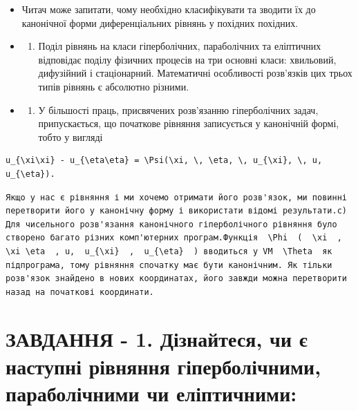 \documentclass[
  ukrainian,
]{article}
\providecommand{\tightlist}{%
  \setlength{\itemsep}{0pt}\setlength{\parskip}{0pt}}
\begin{document}
\begin{itemize}
\item
  Читач може запитати, чому необхідно класифікувати та зводити їх до
  канонічної форми диференціальних рівнянь у похідних похідних.
\item
  \begin{enumerate}
  \def\labelenumi{\alph{enumi})}
  \tightlist
  \item
    Поділ рівнянь на класи гіперболічних, параболічних та еліптичних
    відповідає поділу фізичних процесів на три основні класи: хвильовий,
    дифузійний і стаціонарний. Математичні особливості розв'язків цих
    трьох типів рівнянь є абсолютно різними.
  \end{enumerate}
\item
  \begin{enumerate}
  \def\labelenumi{\alph{enumi})}
  \setcounter{enumi}{1}
  \tightlist
  \item
    У більшості праць, присвячених розв'язанню гіперболічних задач,
    припускається, що початкове рівняння записується у канонічній формі,
    тобто у вигляді
  \end{enumerate}
\end{itemize}

\begin{verbatim}
u_{\xi\xi} - u_{\eta\eta} = \Psi(\xi, \, \eta, \, u_{\xi}, \, u, u_{\eta}).
\end{verbatim}

\begin{verbatim}
Якщо у нас є рівняння і ми хочемо отримати його розв'язок, ми повинні перетворити його у канонічну форму і використати відомі результати.c) Для чисельного розв'язання канонічного гіперболічного рівняння було створено багато різних комп'ютерних програм.Функція  \Phi  (  \xi  ,  \xi \eta  , u,  u_{\xi}  ,  u_{\eta}  ) вводиться у VM  \Theta  як підпрограма, тому рівняння спочатку має бути канонічним. Як тільки розв'язок знайдено в нових координатах, його завжди можна перетворити назад на початкові координати.
\end{verbatim}

\section{ЗАВДАННЯ - 1. Дізнайтеся, чи є наступні рівняння
гіперболічними, параболічними чи
еліптичними:}\label{ux437ux430ux432ux434ux430ux43dux43dux44f---1.-ux434ux456ux437ux43dux430ux439ux442ux435ux441ux44f-ux447ux438-ux454-ux43dux430ux441ux442ux443ux43fux43dux456-ux440ux456ux432ux43dux44fux43dux43dux44f-ux433ux456ux43fux435ux440ux431ux43eux43bux456ux447ux43dux438ux43cux438-ux43fux430ux440ux430ux431ux43eux43bux456ux447ux43dux438ux43cux438-ux447ux438-ux435ux43bux456ux43fux442ux438ux447ux43dux438ux43cux438}
\end{document}
